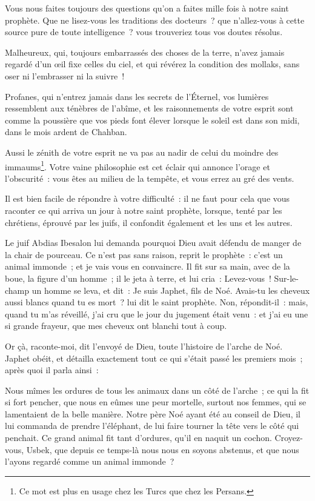 \documentclass[french,twoside]{book} %
\begin{document}
\noindent Vous nous faites toujours des questions qu’on a faites mille fois à notre saint prophète. Que ne lisez-vous les traditions des docteurs ? que n’allez-vous à cette source pure de toute intelligence ? vous trouveriez tous vos doutes résolus.\par
Malheureux, qui, toujours embarrassés des choses de la terre, n’avez jamais regardé d’un œil fixe celles du ciel, et qui révérez la condition des mollaks, sans oser ni l’embrasser ni la suivre !\par
Profanes, qui n’entrez jamais dans les secrets de l’Éternel, vos lumières ressemblent aux ténèbres de l’abîme, et les raisonnements de votre esprit sont comme la poussière que vos pieds font élever lorsque le soleil est dans son midi, dans le mois ardent de Chahban.\par
Aussi le zénith de votre esprit ne va pas au nadir de celui du moindre des immaums\footnote{Ce mot est plus en usage chez les Turcs que chez les Persans.}. Votre vaine philosophie est cet éclair qui annonce l’orage et l’obscurité : vous êtes au milieu de la tempête, et vous errez au gré des vents.\par
Il est bien facile de répondre à votre difficulté : il ne faut pour cela que vous raconter ce qui arriva un jour à notre saint prophète, lorsque, tenté par les chrétiens, éprouvé par les juifs, il confondit également et les uns et les autres.\par
Le juif Abdias Ibesalon lui demanda pourquoi Dieu avait défendu de manger de la chair de pourceau. Ce n’est pas sans raison, reprit le prophète : c’est un animal immonde ; et je vais vous en convaincre. Il fit sur sa main, avec de la boue, la figure d’un homme ; il le jeta à terre, et lui cria : Levez-vous ! Sur-le-champ un homme se leva, et dit : Je suis Japhet, fils de Noé. Avais-tu les cheveux aussi blancs quand tu es mort ? lui dit le saint prophète. Non, répondit-il : mais, quand tu m’as réveillé, j’ai cru que le jour du jugement était venu : et j’ai eu une si grande frayeur, que mes cheveux ont blanchi tout à coup.\par
Or çà, raconte-moi, dit l’envoyé de Dieu, toute l’histoire de l’arche de Noé. Japhet obéit, et détailla exactement tout ce qui s’était passé les premiers mois ; après quoi il parla ainsi :\par
Nous mîmes les ordures de tous les animaux dans un côté de l’arche ; ce qui la fit si fort pencher, que nous en eûmes une peur mortelle, surtout nos femmes, qui se lamentaient de la belle manière. Notre père Noé ayant été au conseil de Dieu, il lui commanda de prendre l’éléphant, de lui faire tourner la tête vers le côté qui penchait. Ce grand animal fit tant d’ordures, qu’il en naquit un cochon. Croyez-vous, Usbek, que depuis ce temps-là nous nous en soyons abstenus, et que nous l’ayons regardé comme un animal immonde ?\par
\end{document}

